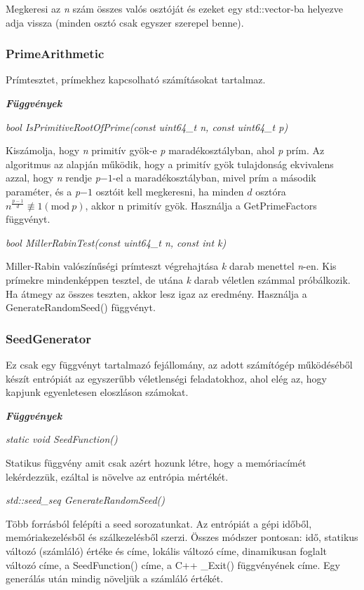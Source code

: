 \documentclass[hidelinks, 12pt]{article}
\begin{document}
Megkeresi az \textit{n} szám összes valós osztóját és ezeket egy std::vector-ba helyezve adja vissza (minden osztó csak egyszer szerepel benne).

\subsubsection*{PrimeArithmetic}

Prímtesztet, prímekhez kapcsolható számításokat tartalmaz.

\textit{\textbf{Függvények}}

\textit{bool IsPrimitiveRootOfPrime(const uint64\_t n, const uint64\_t p)}

Kiszámolja, hogy \textit{n} primitív gyök-e \textit{p} maradékosztályban, ahol \textit{p} prím. Az algoritmus az alapján működik, hogy a primitív gyök tulajdonság ekvivalens azzal, hogy \textit{n} rendje \textit{p}$-1$-el a maradékosztályban, mivel prím a második paraméter, és a \textit{p}$-1$ osztóit kell megkeresni, ha minden $d$ osztóra $n^\frac{\textit{p}-1}{d} \not\equiv 1 (\textrm{mod}\ p)$, akkor n primitív gyök. Használja a GetPrimeFactors függvényt.

\textit{bool MillerRabinTest(const uint64\_t n, const int k)}

Miller-Rabin valószínűségi prímteszt végrehajtása \textit{k} darab menettel \textit{n}-en. Kis prímekre mindenképpen tesztel, de utána \textit{k} darab véletlen számmal próbálkozik. Ha átmegy az összes teszten, akkor lesz igaz az eredmény. Használja a GenerateRandomSeed() függvényt.

\subsubsection*{SeedGenerator}

Ez csak egy függvényt tartalmazó fejállomány, az adott számítógép működéséből készít entrópiát az egyszerűbb véletlenségi feladatokhoz, ahol elég az, hogy kapjunk egyenletesen eloszláson számokat.

\textit{\textbf{Függvények}}

\textit{static void SeedFunction()}

Statikus függvény amit csak azért hozunk létre, hogy a memóriacímét lekérdezzük, ezáltal is növelve az entrópia mértékét.

\textit{std::seed\_seq GenerateRandomSeed()}

Több forrásból felépíti a seed sorozatunkat. Az entrópiát a gépi időből, memóriakezelésből és szálkezelésből szerzi. Összes módszer pontosan: idő, statikus változó (számláló) értéke és címe, lokális változó címe, dinamikusan foglalt változó címe, a SeedFunction() címe, a C++ \_Exit() függvényének címe. Egy generálás után mindig növeljük a számláló értékét.
\end{document}
